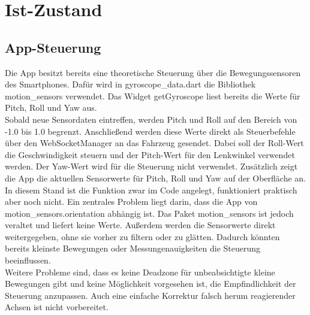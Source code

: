 \section{Ist-Zustand}
\label{sec:ist-zustand}
\subsection{App-Steuerung}
Die App besitzt bereits eine theoretische Steuerung über die Bewegungssensoren des Smartphones. Dafür wird in gyroscope\_data.dart die Bibliothek motion\_sensors verwendet. Das Widget getGyroscope liest bereits die Werte für Pitch, Roll und Yaw aus.
\\
Sobald neue Sensordaten eintreffen, werden Pitch und Roll auf den Bereich von -1.0 bis 1.0 begrenzt. Anschließend werden diese Werte direkt als Steuerbefehle über den WebSocketManager an das Fahrzeug gesendet. Dabei soll der Roll-Wert die Geschwindigkeit steuern und der Pitch-Wert für den Lenkwinkel verwendet werden. Der Yaw-Wert wird für die Steuerung nicht verwendet. Zusätzlich zeigt die App die aktuellen Sensorwerte für Pitch, Roll und Yaw auf der Oberfläche an.
\\
In diesem Stand ist die Funktion zwar im Code angelegt, funktioniert praktisch aber noch nicht. Ein zentrales Problem liegt darin, dass die App von motion\_sensors.orientation abhängig ist. Das Paket motion\_sensors ist jedoch veraltet und liefert keine Werte. Außerdem werden die Sensorwerte direkt weitergegeben, ohne sie vorher zu filtern oder zu glätten. Dadurch könnten bereits kleinste Bewegungen oder Messungenauigkeiten die Steuerung beeinflussen.
\\
Weitere Probleme sind, dass es keine Deadzone für unbeabsichtigte kleine Bewegungen gibt und keine Möglichkeit vorgesehen ist, die Empfindlichkeit der Steuerung anzupassen. Auch eine einfache Korrektur falsch herum reagierender Achsen ist nicht vorbereitet.

